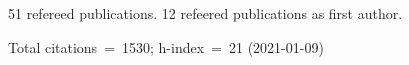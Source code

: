 51 refereed publications. 12 refeered publications as first author.

Total citations~=~1530; h-index~=~21 (2021-01-09)